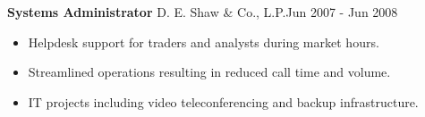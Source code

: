\textbf{Systems Administrator}
D. E. Shaw \& Co., L.P.\hfill Jun 2007 - Jun 2008
\begin{itemize}  \itemsep -2pt %
\item Helpdesk support for traders and analysts during market hours.
\item Streamlined operations resulting in reduced call time and volume.
\item IT projects including video teleconferencing and backup infrastructure.

\end{itemize}
